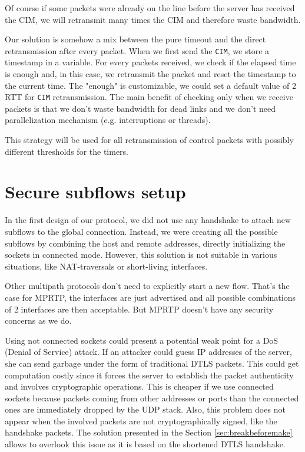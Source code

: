 Of course if some packets were already on the line before the server has received the CIM, we will retransmit many times the CIM and therefore waste bandwidth.

Our solution is somehow a mix between the pure timeout and the direct retransmission after every packet. When we first send the \texttt{CIM}, we store a timestamp in a variable. For every packets received, we check if the elapsed time is enough and, in this case, we retransmit the packet and reset the timestamp to the current time. The "enough" is customizable, we could set a default value of 2 RTT for \texttt{CIM} retransmission. The main benefit of checking only when we receive packets is that we don't waste bandwidth for dead links and we don't need parallelization mechanism (e.g. interruptions or threads).

This strategy will be used for all retransmission of control packets with possibly different thresholds for the timers.

\section{Secure subflows setup}\label{sec:setupflow}

In the first design of our protocol, we did not use any handshake to attach new subflows to the global connection. Instead, we were creating all the possible subflows by combining the host and remote addresses, directly initializing the sockets in connected mode. However, this solution is not suitable in various situations, like NAT-traversals or short-living interfaces. 

Other multipath protocols don't need to explicitly start a new flow. That's the case for MPRTP, the interfaces are just advertised and all possible combinations of 2 interfaces are then acceptable. But MPRTP doesn't have any security concerns as we do.

Using not connected sockets could present a potential weak point for a DoS (Denial of Service) attack. If an attacker could guess IP addresses of the server, she can send garbage under the form of traditional DTLS packets. This could get computation costly since it forces the server to establish the packet authenticity and involves cryptographic operations. This is cheaper if we use connected sockets because packets coming from other addresses or ports than the connected ones are immediately dropped by the UDP stack. Also, this problem does not appear when the involved packets are not cryptographically signed, like the handshake packets. The solution presented in the Section \ref{sec:breakbeforemake} allows to overlook this issue as it is based on the shortened DTLS handshake.

